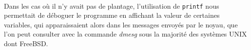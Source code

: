 \paragraph{}
Dans les cas où il n'y avait pas de plantage, l'utilisation de \texttt{printf}
nous permettait de déboguer le programme en affichant la valeur de certaines
variables, qui apparaissaient alors dans les messages envoyés par le noyau, que
l'on peut consulter avec la commande {\em dmesg} sous la majorité des systèmes
UNIX dont FreeBSD.